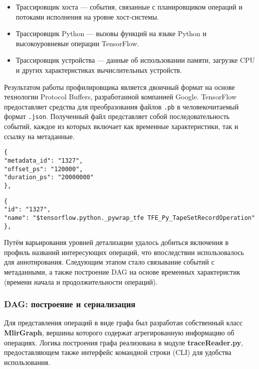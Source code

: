 \begin{itemize}
\item Трассировщик хоста — события, связанные с планировщиком операций и потоками исполнения на уровне хост-системы.
\item Трассировщик Python — вызовы функций на языке Python и высокоуровневые операции TensorFlow.
\item Трассировщик устройства — данные об использовании памяти, загрузке CPU и других характеристиках вычислительных устройств.
\end{itemize}

Результатом работы профилировщика является двоичный формат на основе технологии Protocol Buffers, разработанной компанией Google.
TensorFlow предоставляет средства для преобразования файлов \texttt{.pb} в человекочитаемый формат \texttt{.json}.
Полученный файл представляет собой последовательность событий, каждое из которых включает как временные характеристики, так и ссылку на метаданные.

\noindent
\begin{minipage}{0.48\textwidth}
\begin{lstlisting}[caption={Данные события \textbf{TF Profiler}}]
{
"metadata_id": "1327",
"offset_ps": "120000",
"duration_ps": "20000000"
},
\end{lstlisting}
\end{minipage}\hfill
\begin{minipage}{0.48\textwidth}
\begin{lstlisting}[caption={Метаданные события \textbf{TF Profiler}}]
{
"id": "1327",
"name": "$tensorflow.python._pywrap_tfe TFE_Py_TapeSetRecordOperation"
},
\end{lstlisting}
\end{minipage}

Путём варьирования уровней детализации удалось добиться включения в профиль названий интересующих операций, что впоследствии использовалось для аннотирования.
Следующим этапом стало связывание событий с метаданными, а также построение DAG на основе временных характеристик (времени начала и продолжительности операций).

\subsubsection{DAG: построение и сериализация}

Для представления операций в виде графа был разработан собственный класс \textbf{MlirGraph}, вершины которого содержат агрегированную информацию об операциях.
Логика построения графа реализована в модуле \textbf{traceReader.py}, предоставляющем также интерфейс командной строки (CLI) для удобства использования.

